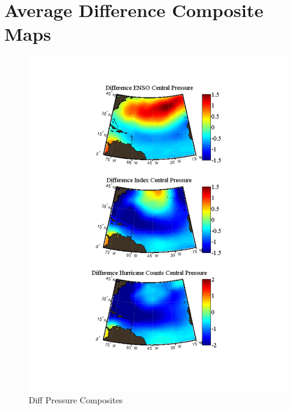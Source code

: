 \documentclass[a4paper,10pt]{article}
\begin{document}
\section{Average Difference Composite Maps}
\begin{figure}[ht]
\begin{minipage}[b]{0.6\linewidth}
\includegraphics[width=\textwidth]{figs/sensitivityResults/compositeMaps/centralPressureAtlanticMap.pdf}
\caption{Diff Pressure Composites}
\label{fig:figure1}
\end{minipage}
\hspace{0cm}
\begin{minipage}[b]{0.6\linewidth}

\end{minipage}
\end{figure}
\end{document}

